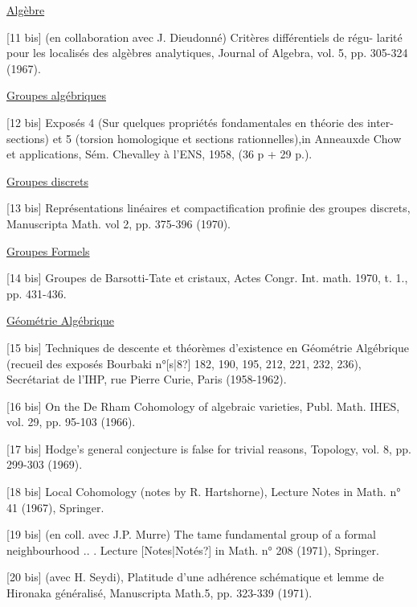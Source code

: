 \documentclass[11pt]{article}
\newcommand{\scanpage}[1]{\par\bigskip\noindent{\small\sffamily[scan #1]}\par}
\newcommand{\mspage}[1]{{\small\sffamily[p.\,#1]}}
\newcommand{\hand}[1]{\textcolor{blue}{#1}}
\newcommand{\uline}[1]{\underline{#1}}
\newcommand{\unsure}[1]{[#1?]}
\begin{document}
\uline{Algèbre}

[11 bis] (en collaboration avec J. Dieudonné) Critères différentiels de régu-%
larité pour les localisés des algèbres analytiques, Journal of Algebra,
vol. 5, pp. 305-324 (1967).

\uline{Groupes algébriques}

[12 bis] Exposés 4 (Sur quelques propriétés fondamentales en théorie des inter-%
sections) et 5 (torsion homologique et sections rationnelles),in
Anneauxde Chow et applications, Sém. Chevalley à l'ENS, 1958, (36 p +
29 p.).

\uline{Groupes discrets}

[13 bis] Représentations linéaires et compactification profinie des groupes
discrets, Manuscripta Math. vol 2, pp. 375-396 (1970).

\uline{Groupes Formels}

[14 bis] Groupes de Barsotti-Tate et cristaux, Actes Congr. Int. math. 1970,
t. 1., pp. 431-436.

\uline{Géométrie Algébrique}

[15 bis] Techniques de descente et théorèmes d'existence en Géométrie Algébrique
(recueil des exposés Bourbaki n°\unsure{s|8} 182, 190, 195, 212, 221, 232, 236),
Secrétariat de l'IHP, rue Pierre Curie, Paris (1958-1962).

[16 bis] On the De Rham Cohomology of algebraic varieties, Publ. Math. IHES,
vol. 29, pp. 95-103 (1966).

[17 bis] Hodge's general conjecture is false for trivial reasons, Topology,
vol. 8, pp. 299-303 (1969).

[18 bis] Local Cohomology (notes by R. Hartshorne), Lecture Notes in Math.
n° 41 (1967), Springer.

[19 bis] (en coll. avec J.P. Murre) The tame fundamental group of a formal
neighbourhood .. . Lecture \unsure{Notes|Notés} in Math. n° 208 (1971), Springer.

[20 bis] (avec H. Seydi), Platitude d'une adhérence schématique et lemme de
Hironaka généralisé, Manuscripta Math.5, pp. 323-339 (1971).

\mspage{\hand{209}}

\clearpage
\scanpage{119/210}
\mspage{- 15 -}
\end{document}

